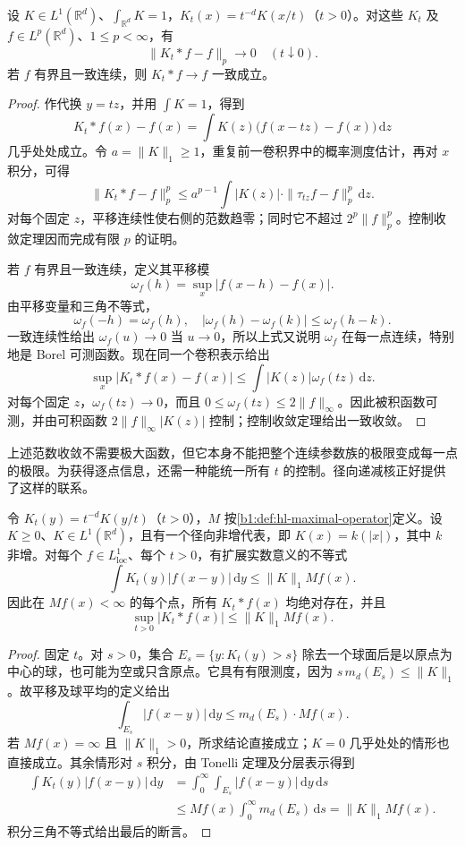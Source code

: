 \begin{proposition}\label{b1:prop:approximate-identity-lp}
设 \(K\in L^1(\mathbb R^d)\)、\(\int_{\mathbb R^d}K=1\)，\(K_t(x)=t^{-d}K(x/t)\)（\(t>0\)）。对这些 \(K_t\) 及 \(f\in L^p(\mathbb R^d)\)、\(1\leq p<\infty\)，有
\[
 \|K_t*f-f\|_p\longrightarrow0\quad(t\downarrow0).
\]
若 \(f\) 有界且一致连续，则 \(K_t*f\to f\) 一致成立。
\end{proposition}
\begin{proof}
作代换 \(y=tz\)，并用 \(\int K=1\)，得到
\[
 K_t*f(x)-f(x)=\int K(z)\bigl(f(x-tz)-f(x)\bigr)\,\mathrm dz
\]
几乎处处成立。令 \(a=\|K\|_1\geq1\)，重复前一卷积界中的概率测度估计，再对 \(x\) 积分，可得
\[
 \|K_t*f-f\|_p^p
 \leq a^{p-1}\int |K(z)|\cdot\|\tau_{tz}f-f\|_p^p\,\mathrm dz.
\]
对每个固定 \(z\)，平移连续性使右侧的范数趋零；同时它不超过 \(2^p\|f\|_p^p\)。控制收敛定理因而完成有限 \(p\) 的证明。

若 \(f\) 有界且一致连续，定义其平移模
\[
 \omega_f(h)=\sup_x|f(x-h)-f(x)|.
\]
由平移变量和三角不等式，
\[
 \omega_f(-h)=\omega_f(h),
 \quad
 |\omega_f(h)-\omega_f(k)|\leq\omega_f(h-k).
\]
一致连续性给出 \(\omega_f(u)\to0\) 当 \(u\to0\)，所以上式又说明 \(\omega_f\) 在每一点连续，特别地是 Borel 可测函数。现在同一个卷积表示给出
\[
 \sup_x|K_t*f(x)-f(x)|
 \leq\int|K(z)|\omega_f(tz)\,\mathrm dz.
\]
对每个固定 \(z\)，\(\omega_f(tz)\to0\)，而且
\(0\leq\omega_f(tz)\leq2\|f\|_\infty\)。因此被积函数可测，并由可积函数 \(2\|f\|_\infty|K(z)|\) 控制；控制收敛定理给出一致收敛。
\end{proof}

上述范数收敛不需要极大函数，但它本身不能把整个连续参数族的极限变成每一点的极限。为获得逐点信息，还需一种能统一所有 \(t\) 的控制。径向递减核正好提供了这样的联系。

\begin{proposition}\label{b1:prop:radial-kernel-maximal}
令 \(K_t(y)=t^{-d}K(y/t)\)（\(t>0\)），\(M\) 按\cref{b1:def:hl-maximal-operator}定义。设 \(K\geq0\)、\(K\in L^1(\mathbb R^d)\)，且有一个径向非增代表，即 \(K(x)=k(|x|)\)，其中 \(k\) 非增。对每个 \(f\in L^1_{\mathrm{loc}}\)、每个 \(t>0\)，有扩展实数意义的不等式
\[
 \int K_t(y)|f(x-y)|\,\mathrm dy\leq\|K\|_1Mf(x).
\]
因此在 \(Mf(x)<\infty\) 的每个点，所有 \(K_t*f(x)\) 均绝对存在，并且
\[
 \sup_{t>0}|K_t*f(x)|\leq\|K\|_1Mf(x).
\]
\end{proposition}
\begin{proof}
固定 \(t\)。对 \(s>0\)，集合 \(E_s=\{y:K_t(y)>s\}\) 除去一个球面后是以原点为中心的球，也可能为空或只含原点。它具有有限测度，因为 \(s\,m_d(E_s)\leq\|K\|_1\)。故平移及球平均的定义给出
\[
 \int_{E_s}|f(x-y)|\,\mathrm dy\leq m_d(E_s)\cdot Mf(x).
\]
若 \(Mf(x)=\infty\) 且 \(\|K\|_1>0\)，所求结论直接成立；\(K=0\) 几乎处处的情形也直接成立。其余情形对 \(s\) 积分，由 Tonelli 定理及分层表示得到
\[
 \begin{aligned}
 \int K_t(y)|f(x-y)|\,\mathrm dy
 &=\int_0^\infty\int_{E_s}|f(x-y)|\,\mathrm dy\,\mathrm ds\\
 &\leq Mf(x)\int_0^\infty m_d(E_s)\,\mathrm ds
 =\|K\|_1Mf(x).
 \end{aligned}
\]
积分三角不等式给出最后的断言。
\end{proof}

